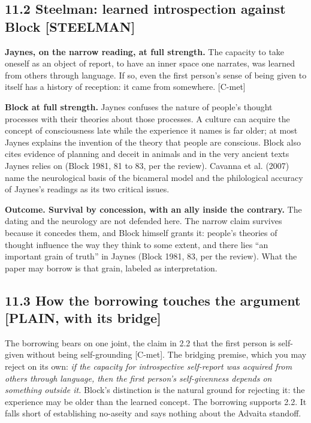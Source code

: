 \documentclass[11pt]{article}
\newcommand{\register}[1]{{\ttfamily\small #1}}
\begin{document}
\subsection*{11.2 Steelman: learned introspection against Block \register{[STEELMAN]}}

\textbf{Jaynes, on the narrow reading, at full strength.} The capacity to take oneself as an object of report, to have an inner space one narrates, was learned from others through language. If so, even the first person's sense of being given to itself has a history of reception: it came from somewhere. [C-met]

\textbf{Block at full strength.} Jaynes confuses the nature of people's thought processes with their theories about those processes. A culture can acquire the concept of consciousness late while the experience it names is far older; at most Jaynes explains the invention of the theory that people are conscious. Block also cites evidence of planning and deceit in animals and in the very ancient texts Jaynes relies on (Block 1981, 81 to 83, per the review). Cavanna et al. (2007) name the neurological basis of the bicameral model and the philological accuracy of Jaynes's readings as its two critical issues.

\textbf{Outcome. Survival by concession, with an ally inside the contrary.} The dating and the neurology are not defended here. The narrow claim survives because it concedes them, and Block himself grants it: people's theories of thought influence the way they think to some extent, and there lies ``an important grain of truth'' in Jaynes (Block 1981, 83, per the review). What the paper may borrow is that grain, labeled as interpretation.

\subsection*{11.3 How the borrowing touches the argument \register{[PLAIN, with its bridge]}}

The borrowing bears on one joint, the claim in 2.2 that the first person is self-given without being self-grounding [C-met]. The bridging premise, which you may reject on its own: \emph{if the capacity for introspective self-report was acquired from others through language, then the first person's self-givenness depends on something outside it.} Block's distinction is the natural ground for rejecting it: the experience may be older than the learned concept. The borrowing supports 2.2. It falls short of establishing no-aseity and says nothing about the Advaita standoff.
\end{document}
